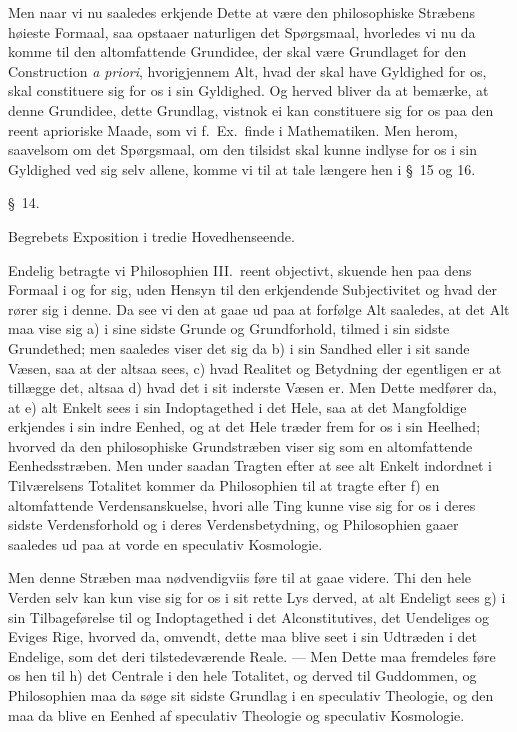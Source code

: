 \documentclass[12pt,a4paper]{book}
\newcommand{\apage}[1]{\marginnote{\footnotesize\textit{[#1]}}}
\begin{document}
{\small Men naar vi nu saaledes erkjende Dette at være den philosophiske Stræbens
høieste Formaal, saa opstaaer naturligen det Spørgsmaal, hvorledes vi nu da komme
til den altomfattende Grundidee, der skal være Grundlaget for den Construction
\textit{a priori}, hvorigjennem Alt, hvad der skal have Gyldighed for os, skal
constituere sig for os i sin Gyldighed. Og herved bliver da at bemærke, at denne
Grundidee, dette Grundlag, vistnok ei kan constituere sig for os paa den reent
aprioriske Maade, som vi f.\ Ex.\ finde i Mathematiken. Men herom, saavelsom om det
Spørgsmaal, om den tilsidst skal kunne indlyse for os i sin Gyldighed ved sig selv
allene, komme vi til at tale længere hen i \S~15 og 16.\par} \apage{56} 

\begin{center}\large\S~14.\end{center}
\begin{center}Begrebets Exposition i tredie Hovedhenseende.\end{center}

Endelig betragte vi Philosophien III.~reent objectivt, skuende hen paa dens Formaal
i og for sig, uden Hensyn til den erkjendende Subjectivitet og hvad der rører sig i
denne. Da see vi den at gaae ud paa at forfølge Alt saaledes, at det Alt maa vise
sig a) i sine sidste Grunde og Grundforhold, tilmed i sin sidste Grundethed; men
saaledes viser det sig da b) i sin Sandhed eller i sit sande Væsen, saa at der
altsaa sees, c) hvad Realitet og Betydning der egentligen er at tillægge det, altsaa
d) hvad det i sit inderste Væsen er. Men Dette medfører da, at e) alt Enkelt sees i
sin Indoptagethed i det Hele, saa at det Mangfoldige erkjendes i sin indre Eenhed,
og at det Hele træder frem for os i sin Heelhed; hvorved da den philosophiske
Grundstræben viser sig som en altomfattende Eenhedsstræben. Men under saadan Tragten
efter at see alt Enkelt indordnet i Tilværelsens Totalitet kommer da Philosophien
til at tragte efter f) en altomfattende Verdensanskuelse, hvori alle Ting kunne vise
sig for os i deres sidste Verdensforhold og i deres Verdensbetydning, og
Philosophien gaaer saaledes ud paa at vorde en speculativ Kosmologie.

Men denne Stræben maa nødvendigviis føre til at gaae videre. Thi den hele Verden
selv kan kun vise sig for os i sit rette Lys derved, at alt Endeligt sees g) i sin
Tilbageførelse til og Indoptagethed i det Alconstitutives, \apage{57}  det Uendeliges og Eviges
Rige, hvorved da, omvendt, dette maa blive seet i sin Udtræden i det Endelige, som
det deri tilstedeværende Reale. --- Men Dette maa fremdeles føre os hen til h) det
Centrale i den hele Totalitet, og derved til Guddommen, og Philosophien maa da søge
sit sidste Grundlag i en speculativ Theologie, og den maa da blive en Eenhed af
speculativ Theologie og speculativ Kosmologie.
\end{document}
